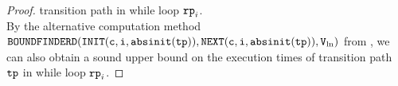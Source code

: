 \begin{proof}
        transition path in while loop $\mathtt{rp}_i$.
        \\
        By the alternative computation method 
        $\mathtt{BOUNDFINDERD(INIT(c, i, \mathtt{abs}{\mathtt{init}}(\mathtt{tp})), NEXT(c, i, \mathtt{abs}{\mathtt{init}}(\mathtt{tp})), V_{\ln})}$ from \cite{GulwaniJK09},
        we can also obtain a sound upper bound on the 
        execution times of 
        transition path $\mathtt{tp}$ in while loop $\mathtt{rp}_i$.
  \end{proof}

